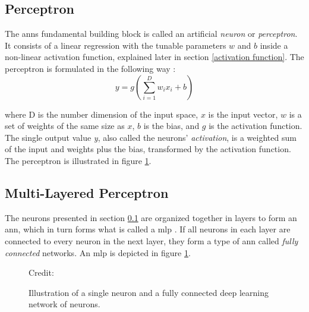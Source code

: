     \subsection{Perceptron} \label{perceptron}
        The \gls{ann}s fundamental building block is called an artificial \textit{neuron} or \textit{perceptron}. It consists of a linear regression with the tunable parameters $w$ and $b$ inside a non-linear activation function, explained later in section \ref{activation function}. The perceptron is formulated in the following way \cite{razavi2021deep_exp_per}:
            \begin{equation} \label{eq_perceptron}
                y = g (\sum_{i=1}^{D}w_ix_i + b)
            \end{equation}
            
        where D is the number dimension of the input space, $x$ is the input vector, $w$ is a set of weights of the same size as $x$, $b$ is the bias, and $g$ is the activation function. The single output value \textit{y}, also called the neurons' \textit{activation}, is a weighted sum of the input and weights plus the bias, transformed by the activation function. The perceptron is illustrated in figure \ref{Perceptron / MLP}.
    
    \subsection{Multi-Layered Perceptron} \label{MLP}
        The neurons presented in section \ref{perceptron} are organized together in layers to form an \gls{ann}, which in turn forms what is called a \gls{mlp} \cite{razavi2021deep_exp_per}. If all neurons in each layer are connected to every neuron in the next layer, they form a type of \gls{ann} called \textit{fully connected} networks. An \gls{mlp} is depicted in figure \ref{Perceptron / MLP}.
        
            \begin{figure}[H]
                \centering
                
        	
                
                \caption[The perceptron and multi-layer perceptron]{Illustration of a single neuron and a fully connected deep learning network of neurons.}
              	\medskip 
                \hspace*{15pt}\hbox{\scriptsize Credit: \citeauthor{razavi2021deep_exp_per} \cite{razavi2021deep_exp_per}}
                \label{Perceptron / MLP}
            \end{figure}
        
